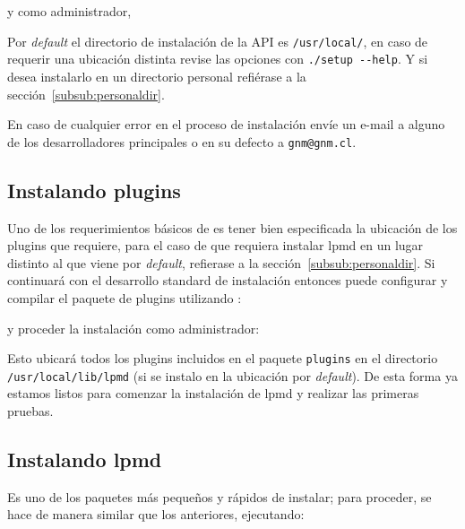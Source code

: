 
y como administrador,


Por \textit{default} el directorio de instalaci\'on de la API es \verb|/usr/local/|, en caso de requerir una ubicaci\'on distinta revise las opciones con \verb|./setup --help|. Y si desea instalarlo en un directorio personal refi\'erase a la secci\'on~\ref{subsub:personaldir}.

En caso de cualquier error en el proceso de instalaci\'on env\'ie un e-mail a alguno de los desarrolladores principales o en su defecto a \verb|gnm@gnm.cl|.

\subsection{Instalando plugins}

Uno de los requerimientos b\'asicos de {\lpmd} es tener bien especificada la ubicaci\'on de los plugins que {\lpmd} requiere, para el caso de que requiera instalar lpmd en un lugar distinto al que viene por \textit{default}, refierase a la secci\'on~\ref{subsub:personaldir}. Si continuará con el desarrollo standard de instalaci\'on entonces puede configurar y compilar el paquete de plugins utilizando :


y proceder la instalaci\'on como administrador:


Esto ubicar\'a todos los plugins incluidos en el paquete \verb|plugins| en el directorio \verb|/usr/local/lib/lpmd| (si se instalo en la ubicaci\'on por \textit{default}). De esta forma ya estamos listos para comenzar la instalaci\'on de lpmd y realizar las primeras pruebas.

\subsection{Instalando lpmd}

Es uno de los paquetes m\'as peque\~nos y r\'apidos de instalar; para proceder, se hace de manera similar que los anteriores, ejecutando:

